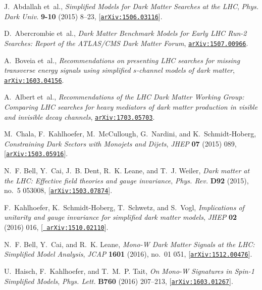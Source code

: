 \documentclass[review]{elsarticle}
\begin{document}
\begin{thebibliography}{100}
J.~Abdallah et~al., {\it {Simplified Models for Dark Matter Searches at the
  LHC}},  {\em Phys. Dark Univ.} {\bf 9-10} (2015) 8--23,
  [\href{http://arxiv.org/abs/1506.03116}{{\tt arXiv:1506.03116}}].

D.~Abercrombie et~al., {\it {Dark Matter Benchmark Models for Early LHC Run-2
  Searches: Report of the ATLAS/CMS Dark Matter Forum}},
  \href{http://arxiv.org/abs/1507.00966}{{\tt arXiv:1507.00966}}.

A.~Boveia et~al., {\it {Recommendations on presenting LHC searches for missing
  transverse energy signals using simplified $s$-channel models of dark
  matter}},  \href{http://arxiv.org/abs/1603.04156}{{\tt arXiv:1603.04156}}.

A.~Albert et~al., {\it {Recommendations of the LHC Dark Matter Working Group:
  Comparing LHC searches for heavy mediators of dark matter production in
  visible and invisible decay channels}},
  \href{http://arxiv.org/abs/1703.05703}{{\tt arXiv:1703.05703}}.

M.~Chala, F.~Kahlhoefer, M.~McCullough, G.~Nardini, and K.~Schmidt-Hoberg, {\it
  {Constraining Dark Sectors with Monojets and Dijets}},  {\em JHEP} {\bf 07}
  (2015) 089, [\href{http://arxiv.org/abs/1503.05916}{{\tt arXiv:1503.05916}}].

N.~F. Bell, Y.~Cai, J.~B. Dent, R.~K. Leane, and T.~J. Weiler, {\it {Dark
  matter at the LHC: Effective field theories and gauge invariance}},  {\em
  Phys. Rev.} {\bf D92} (2015), no.~5 053008,
  [\href{http://arxiv.org/abs/1503.07874}{{\tt arXiv:1503.07874}}].

F.~Kahlhoefer, K.~Schmidt-Hoberg, T.~Schwetz, and S.~Vogl, {\it {Implications
  of unitarity and gauge invariance for simplified dark matter models}},  {\em
  JHEP} {\bf 02} (2016) 016, [\href{http://arxiv.org/abs/1510.02110}{{\tt
  arXiv:1510.02110}}].

N.~F. Bell, Y.~Cai, and R.~K. Leane, {\it {Mono-W Dark Matter Signals at the
  LHC: Simplified Model Analysis}},  {\em JCAP} {\bf 1601} (2016), no.~01 051,
  [\href{http://arxiv.org/abs/1512.00476}{{\tt arXiv:1512.00476}}].

U.~Haisch, F.~Kahlhoefer, and T.~M.~P. Tait, {\it {On Mono-W Signatures in
  Spin-1 Simplified Models}},  {\em Phys. Lett.} {\bf B760} (2016) 207--213,
  [\href{http://arxiv.org/abs/1603.01267}{{\tt arXiv:1603.01267}}].


\end{thebibliography}
\end{document}
